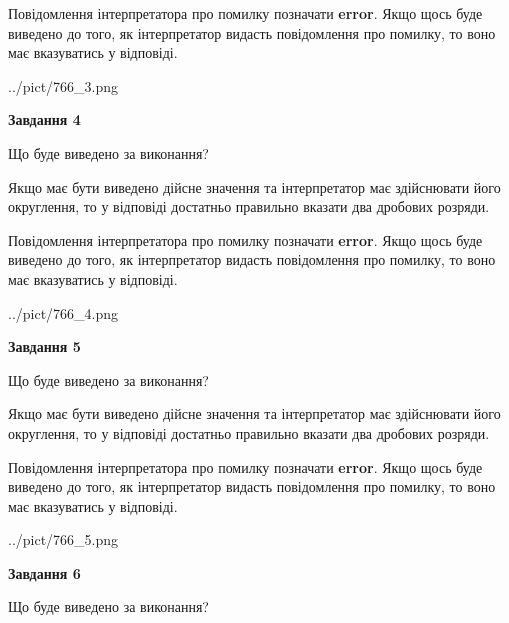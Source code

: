\documentclass[12pt, ukrainian]{article}
\begin{document}
{\begin {Large}
Повідомлення інтерпретатора про помилку позначати \textbf{error}.
Якщо щось буде виведено до того, як інтерпретатор видасть повідомлення про помилку, 
то воно має вказуватись у відповіді. \par

\begin{center}
	{../pict/766_3.png}
\end{center}
\newpage

{\begin {center}\textbf{Завдання 4}\end {center}}\par
Що буде виведено за виконання? \par

Якщо має бути виведено дійсне значення та інтерпретатор має здійснювати його округлення, 
то у відповіді достатньо правильно вказати два дробових розряди.

Повідомлення інтерпретатора про помилку позначати \textbf{error}.
Якщо щось буде виведено до того, як інтерпретатор видасть повідомлення про помилку, 
то воно має вказуватись у відповіді. \par

\begin{center}
	{../pict/766_4.png}
\end{center}
\newpage

{\begin {center}\textbf{Завдання 5}\end {center}}\par
Що буде виведено за виконання? \par

Якщо має бути виведено дійсне значення та інтерпретатор має здійснювати його округлення, 
то у відповіді достатньо правильно вказати два дробових розряди.

Повідомлення інтерпретатора про помилку позначати \textbf{error}.
Якщо щось буде виведено до того, як інтерпретатор видасть повідомлення про помилку, 
то воно має вказуватись у відповіді. \par

\begin{center}
	{../pict/766_5.png}
\end{center}
\newpage

{\begin {center}\textbf{Завдання 6}\end {center}}\par
Що буде виведено за виконання? \par


\end{Large}}
\end{document}
